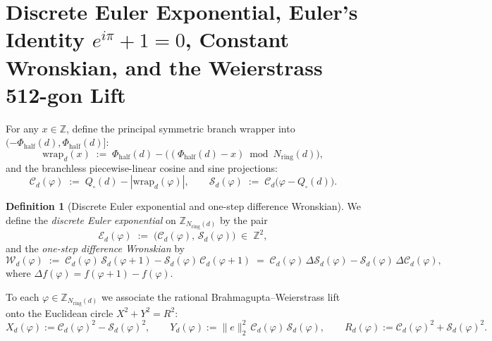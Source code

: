 \documentclass[11pt,a4paper]{article}
\theoremstyle{plain}
\theoremstyle{definition}
\newtheorem{definition}[theorem]{Definition}
\begin{document}
\section{Discrete Euler Exponential, Euler's Identity \texorpdfstring{$e^{i\pi}+1=0$}{e\^{}(i pi)+1=0}, Constant Wronskian, and the Weierstrass 512-gon Lift}
\label{sec:wronskian-euler}

For any $x\in\mathbb{Z}$, define the principal symmetric branch wrapper into $(-\Phi_{\mathrm{half}}(d),\Phi_{\mathrm{half}}(d)]$:
\begin{equation}
  \label{eq:wrap-ring}
  \mathrm{wrap}_d(x) \;:=\; \Phi_{\mathrm{half}}(d) - \bigl((\Phi_{\mathrm{half}}(d) - x) \bmod N_{\mathrm{ring}}(d)\bigr),
\end{equation}
and the branchless piecewise-linear cosine and sine projections:
\begin{equation}
  \label{eq:proj-cs}
  \mathcal{C}_d(\varphi) \;:=\; Q_\square(d) - |\mathrm{wrap}_d(\varphi)|,\qquad
  \mathcal{S}_d(\varphi) \;:=\; \mathcal{C}_d\bigl(\varphi - Q_\square(d)\bigr).
\end{equation}

\begin{definition}[Discrete Euler exponential and one-step difference Wronskian]
\label{def:euler-exp-wronskian}
We define the \emph{discrete Euler exponential} on $\mathbb{Z}_{N_{\mathrm{ring}}(d)}$ by the pair
\[
  \mathcal{E}_d(\varphi) \;:=\; \bigl(\mathcal{C}_d(\varphi),\,\mathcal{S}_d(\varphi)\bigr) \;\in\; \mathbb{Z}^2,
\]
and the \emph{one-step difference Wronskian} by
\begin{equation}
  \label{eq:rotator-wronskian}
  \mathcal{W}_d(\varphi) \;:=\; \mathcal{C}_d(\varphi)\,\mathcal{S}_d(\varphi+1) - \mathcal{S}_d(\varphi)\,\mathcal{C}_d(\varphi+1)
  \;=\; \mathcal{C}_d(\varphi)\,\Delta\mathcal{S}_d(\varphi) - \mathcal{S}_d(\varphi)\,\Delta\mathcal{C}_d(\varphi),
\end{equation}
where $\Delta f(\varphi) = f(\varphi+1)-f(\varphi)$.
\end{definition}

To each $\varphi\in\mathbb{Z}_{N_{\mathrm{ring}}(d)}$ we associate the rational Brahmagupta--Weierstrass lift onto the Euclidean circle $X^2+Y^2=R^2$:
\begin{equation}
  \label{eq:weierstrass-lift}
  X_d(\varphi) := \mathcal{C}_d(\varphi)^2 - \mathcal{S}_d(\varphi)^2,\qquad
  Y_d(\varphi) := \|e\|_2^2\,\mathcal{C}_d(\varphi)\,\mathcal{S}_d(\varphi),\qquad
  R_d(\varphi) := \mathcal{C}_d(\varphi)^2 + \mathcal{S}_d(\varphi)^2.
\end{equation}
\end{document}
